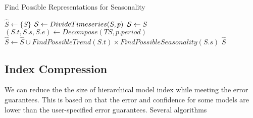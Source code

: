 \documentclass{sigmod}
\begin{document}
\begin{algorithm}[tp]
\caption{Find Possible Representations for Seasonality}
\label{alg:s}
\begin{algorithmic}[1]
\State $\hat{S} \gets  \{S\}$ \label{algs:s0}
 \label{algs:s1}
\State ${\cal S}\gets                DivideTimeseries(S,p)$
\Else 
\State ${\cal S} \gets S$
\EndIf\label{algs:s2}
     \label{algs:s3}
\State $(S.t,S.s,S.e) \gets Decompose (TS, p.period)$
\State $\hat{S} \gets \hat{S} \cup FindPossibleTrend(S.t) \times FindPossibleSeasonality(S.s)$
\EndFor \label{algs:s4}
\EndFor
{} $\hat{S}$
\EndProcedure
\end{algorithmic}
\end{algorithm}


\subsection{Index Compression}
We can reduce the the size of hierarchical model index while meeting the error guarantees. This is based on that  the error and confidence for some models are  lower than  the user-specified error guarantees. Several algorithms 
\end{document}
